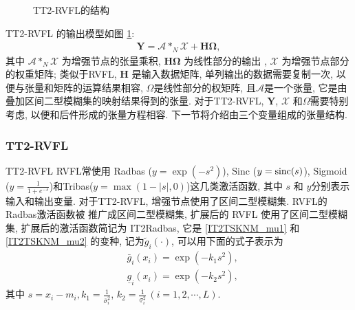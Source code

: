 \begin{figure} [!htbp]
\begin{center}
\caption{TT2-RVFL的结构}
\label{TensorRVFL20180927-2}
\end{center}
\end{figure}
TT2-RVFL 的输出模型如图 \ref{TensorRVFL20180927-2}:
\begin{align}
    \bm Y=\mathcal A *_N \mathcal X+\bm H \bm \Omega,\label{TensorRVFLEq05}
\end{align}
其中 $\mathcal A *_N \mathcal X$ 为增强节点的张量乘积, $\bm H \bm \Omega$ 为线性部分的输出 , $\mathcal X$ 为增强节点部分的权重矩阵;
类似于RVFL, $\bm H$ 是输入数据矩阵, 单列输出的数据需要复制一次, 以便与张量和矩阵的运算结果相容, $\Omega$是线性部分的权矩阵, 且$\mathcal A$是一个张量, 它是由 叠加区间二型模糊集的映射结果得到的张量.
对于TT2-RVFL, $\bm Y$, $\mathcal X$ 和$\Omega$需要特别考虑, 以便和后件形成的张量方程相容. 下一节将介绍由三个变量组成的张量结构.
\subsubsection{TT2-RVFL} {TT2-RVFL}
RVFL常使用 Radbas ($y = \exp(-s^2)$), Sinc ($y = \textup{sinc} (s)$), Sigmoid ($y = \frac 1 {1+e^{-s} } $)和Tribas($y = \max(1 - |s|, 0)$)这几类激活函数, 其中 $s$ 和 $y$分别表示输入和输出变量.
对于TT2-RVFL, 增强节点使用了区间二型模糊集. RVFL的 Radbas激活函数被 推广成区间二型模糊集, 扩展后的 RVFL 使用了区间二型模糊集, 扩展后的激活函数简记为 IT2Radbas, 它是 \eqref{IT2TSKNM_mu1} 和 \eqref{IT2TSKNM_mu2} 的变种,  记为$\tilde g_i(\cdot)$, 可以用下面的式子表示为
 \begin{align}
  &\bar{g} _{i} (x_i)=\exp(-k_1 s^2),\label{IT2TSKNM_g1} \\
  &\underline{g} _{i} (x_i)=\exp(-k_2 s^2),\label{IT2TSKNM_g2}
\end{align}
其中 $s=x_i-m_{i}, k_1=\frac{1} {\bar{\sigma} ^2_{i} } $, $k_2=\frac{1} {\underline{\sigma} ^2_{i} } \, (i=1,2,\cdots, L)$.


